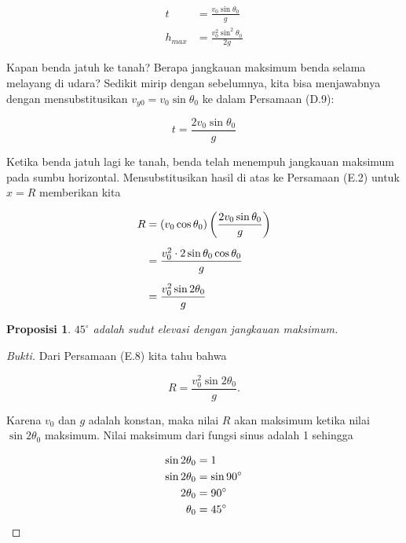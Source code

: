 \documentclass[12pt, a4paper]{article}\usepackage[utf8]{inputenc}
\theoremstyle{plain}
\theoremstyle{plain}
\newtheorem{prop}[teorema]{Proposisi}
\numberwithin{equation}{section}
\theoremstyle{definition}
\begin{document}
	\vspace{-1em}
	\begin{align}
		t &= \frac{v_0 \sin \theta_0}{g}\\[.7em]
		h_{max} &= \frac{v_0^2 \sin^2 \theta_0}{2g}
	\end{align}
	
	Kapan benda jatuh ke tanah? Berapa jangkauan maksimum benda selama melayang di udara? Sedikit mirip dengan sebelumnya, kita bisa menjawabnya dengan mensubstitusikan $v_{y0} = v_0 \sin \theta_0$ ke dalam Persamaan (D.9):
	
	\begin{equation}
		t = \frac{2v_0 \sin \theta_0}{g}
	\end{equation}

	Ketika benda jatuh lagi ke tanah, benda telah menempuh jangkauan maksimum pada sumbu horizontal. Mensubstitusikan hasil di atas ke Persamaan (E.2) untuk $x = R$ memberikan kita
	
	\vspace{-1em}
	
	\begin{align}
		R &= \left( v_0 \cos \theta_0 \right) \left( \frac{2v_0 \sin \theta_0}{g} \right) \notag \\[.5em]
		&= \frac{v_0^2 \cdot 2 \sin \theta_0 \cos \theta_0}{g} \notag \\[.5em]
		&= \frac{v_0^2 \sin 2 \theta_0}{g}
	\end{align}

	\begin{prop}
		$45^{\circ}$ adalah sudut elevasi dengan jangkauan maksimum.
	\end{prop}

	\begin{proof}[Bukti]
		Dari Persamaan (E.8) kita tahu bahwa
		
		\vspace{-.5em}
		
		\begin{equation*}
			R = \frac{v_0^2 \sin 2 \theta_0}{g}.
		\end{equation*}
	
		Karena $v_0$ dan $g$ adalah konstan, maka nilai $R$ akan maksimum ketika nilai $\sin 2 \theta_0$ maksimum. Nilai maksimum dari fungsi sinus adalah 1 sehingga
		
		\vspace{-1.7em}
		
		\begin{align*}
			\sin 2 \theta_0 &= 1 \\
			\sin 2 \theta_0 &= \sin 90^\circ\\
			2 \theta_0 &= 90^\circ\\
			\theta_0 &= 45^\circ \qedhere
		\end{align*}
	\end{proof}
	
\end{document}
